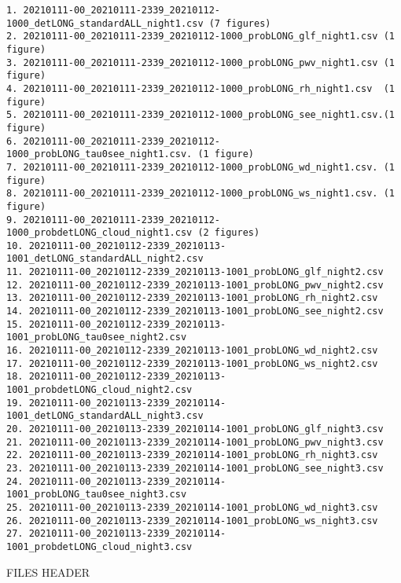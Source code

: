 \begin{verbatim}
1. 20210111-00_20210111-2339_20210112-1000_detLONG_standardALL_night1.csv (7 figures)
2. 20210111-00_20210111-2339_20210112-1000_probLONG_glf_night1.csv (1 figure)
3. 20210111-00_20210111-2339_20210112-1000_probLONG_pwv_night1.csv (1 figure)
4. 20210111-00_20210111-2339_20210112-1000_probLONG_rh_night1.csv  (1 figure)
5. 20210111-00_20210111-2339_20210112-1000_probLONG_see_night1.csv.(1 figure)
6. 20210111-00_20210111-2339_20210112-1000_probLONG_tau0see_night1.csv. (1 figure)
7. 20210111-00_20210111-2339_20210112-1000_probLONG_wd_night1.csv. (1 figure)
8. 20210111-00_20210111-2339_20210112-1000_probLONG_ws_night1.csv. (1 figure)
9. 20210111-00_20210111-2339_20210112-1000_probdetLONG_cloud_night1.csv (2 figures)
10. 20210111-00_20210112-2339_20210113-1001_detLONG_standardALL_night2.csv
11. 20210111-00_20210112-2339_20210113-1001_probLONG_glf_night2.csv
12. 20210111-00_20210112-2339_20210113-1001_probLONG_pwv_night2.csv
13. 20210111-00_20210112-2339_20210113-1001_probLONG_rh_night2.csv
14. 20210111-00_20210112-2339_20210113-1001_probLONG_see_night2.csv
15. 20210111-00_20210112-2339_20210113-1001_probLONG_tau0see_night2.csv
16. 20210111-00_20210112-2339_20210113-1001_probLONG_wd_night2.csv
17. 20210111-00_20210112-2339_20210113-1001_probLONG_ws_night2.csv
18. 20210111-00_20210112-2339_20210113-1001_probdetLONG_cloud_night2.csv
19. 20210111-00_20210113-2339_20210114-1001_detLONG_standardALL_night3.csv
20. 20210111-00_20210113-2339_20210114-1001_probLONG_glf_night3.csv
21. 20210111-00_20210113-2339_20210114-1001_probLONG_pwv_night3.csv
22. 20210111-00_20210113-2339_20210114-1001_probLONG_rh_night3.csv
23. 20210111-00_20210113-2339_20210114-1001_probLONG_see_night3.csv
24. 20210111-00_20210113-2339_20210114-1001_probLONG_tau0see_night3.csv
25. 20210111-00_20210113-2339_20210114-1001_probLONG_wd_night3.csv
26. 20210111-00_20210113-2339_20210114-1001_probLONG_ws_night3.csv
27. 20210111-00_20210113-2339_20210114-1001_probdetLONG_cloud_night3.csv
\end{verbatim}

FILES HEADER 

